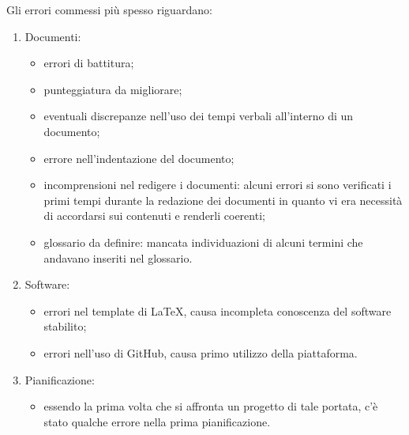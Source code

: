 \documentclass[../piano_di_qualifica.tex]{subfiles}
\begin{document}
Gli errori commessi più spesso riguardano:
\begin{enumerate}
    \item Documenti:
    \begin{itemize}
        \item errori di battitura; 
        \item punteggiatura da migliorare;
        \item eventuali discrepanze nell'uso dei tempi verbali all'interno di un documento;
        \item errore nell'indentazione del documento;
        \item incomprensioni nel redigere i documenti: alcuni errori si sono verificati i primi tempi durante la redazione dei documenti in quanto 
                vi era necessità di accordarsi sui contenuti e renderli coerenti;
        \item glossario da definire: mancata individuazioni di alcuni termini che andavano inseriti nel glossario.
    \end{itemize}
    \item Software:
    \begin{itemize}
        \item errori nel template di \LaTeX, causa incompleta conoscenza del software stabilito;
        \item errori nell'uso di GitHub, causa primo utilizzo della piattaforma.
    \end{itemize}
    \item Pianificazione:
    \begin{itemize}
        \item essendo la prima volta che si affronta un progetto di tale portata, c'è stato qualche errore nella prima pianificazione.
    \end{itemize}
\end{enumerate}
\end{document}
